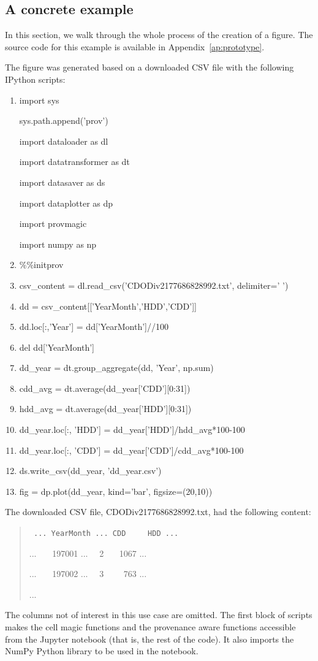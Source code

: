 \subsection{A concrete example}
In this section, we walk through the whole process of the creation of a figure. The source code for this example is available in Appendix~\ref{ap:prototype}. 

The figure was generated based on a downloaded CSV file with the following IPython scripts:
\begin{enumerate}
	\item\noindent import sys
	
	\noindent sys.path.append('prov')
	
	\noindent import dataloader as dl
	
	\noindent import datatransformer as dt
	
	\noindent import datasaver as ds
	
	\noindent import dataplotter as dp
	
	\noindent import provmagic
	
	\noindent import numpy as np
	\item \%\%initprov
	\item csv\_content = dl.read\_csv('CDODiv2177686828992.txt', delimiter=' ')
	\item dd = csv\_content[['YearMonth','HDD','CDD']]
	\item dd.loc[:,'Year'] = dd['YearMonth']//100
	\item del dd['YearMonth']
	\item dd\_year = dt.group\_aggregate(dd, 'Year', np.sum)
	\item cdd\_avg = dt.average(dd\_year['CDD'][0:31])
	\item hdd\_avg = dt.average(dd\_year['HDD'][0:31])
	\item dd\_year.loc[:, 'HDD'] = dd\_year['HDD']/hdd\_avg*100-100
	\item dd\_year.loc[:, 'CDD'] = dd\_year['CDD']/cdd\_avg*100-100
	\item ds.write\_csv(dd\_year, 'dd\_year.csv')
	\item fig = dp.plot(dd\_year, kind='bar', figsize=(20,10))
\end{enumerate}
The downloaded CSV file, CDODiv2177686828992.txt, had the following content:
\begin{quotation}\tt
	\noindent ... YearMonth ... CDD \ \ \ \ HDD ...
	 
	\noindent ... \ \ \ 197001 ... \ \ 2 \ \ \ 1067 ...
	 
	\noindent ... \ \ \ 197002 ... \ \ 3 \ \ \ \ 763 ...
	
	\noindent ... 
\end{quotation}
The columns not of interest in this use case are omitted. The first block of scripts makes the cell magic functions and the provenance aware functions accessible from the Jupyter notebook (that is, the rest of the code). It also imports the NumPy Python library to be used in the notebook.

